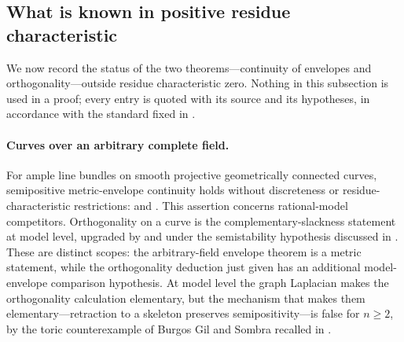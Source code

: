 \subsection{What is known in positive residue characteristic}
\label{sec:ch27-positive-characteristic}

We now record the status of the two theorems---continuity of envelopes and
orthogonality---outside residue characteristic zero.  Nothing in this
subsection is used in a proof; every entry is quoted with its source and its
hypotheses, in accordance with the standard fixed in
.

\paragraph{Curves over an arbitrary complete field.}
For ample line bundles on smooth projective geometrically connected
curves, semipositive metric-envelope continuity holds without discreteness
or residue-characteristic restrictions:
\cite[Theorem~1.1]{GJKM19} and .
This assertion concerns rational-model competitors.
Orthogonality on a curve is the complementary-slackness statement
 at model level, upgraded by
 and
 under the semistability
hypothesis discussed in .  These are distinct scopes: the arbitrary-field envelope theorem is a
metric statement, while the orthogonality deduction just given has an
additional model-envelope comparison hypothesis.
At model level the graph Laplacian makes the orthogonality calculation
elementary, but
the mechanism that makes them elementary---retraction to a skeleton
preserves semipositivity---is false for $n\geq2$, by the toric
counterexample of Burgos Gil and Sombra recalled in
.

